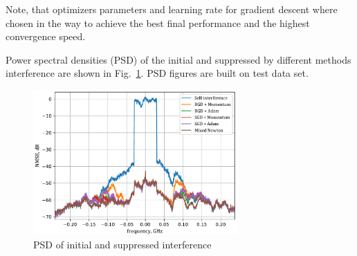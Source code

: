 \documentclass[12pt]{article}
\begin{document}
Note, that optimizers parameters and learning rate for gradient descent where chosen in the way to achieve the best final performance and the highest convergence speed.

Power spectral densities (PSD) of the initial and suppressed by different methods interference are shown in Fig.~\ref{psd}. PSD figures are built on test data set.
\begin{figure}[h!]
    \centering
    \captionsetup{justification=centering}
    \centerline{\includegraphics[width = 0.7\textwidth]{figures/psd/psd.pdf}}
    \caption{PSD of initial and suppressed interference}
    \label{psd}
\end{figure}
\end{document}
